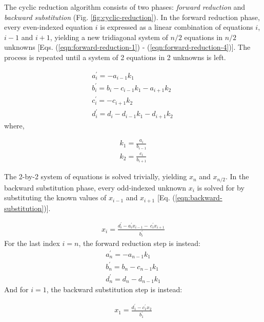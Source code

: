 The cyclic reduction algorithm consists of two phases:
\emph{forward reduction} and \emph{backward substitution}
(Fig. \ref{fig:cyclic-reduction}).
In the forward reduction phase,
every even-indexed equation $i$
is expressed as a
linear combination of equations $i$, $i-1$ and $i+1$,
yielding a new tridiagonal system of
$n/2$ equations in $n/2$ unknowns
[Eqs. (\ref{eqn:forward-reduction-1}) - (\ref{eqn:forward-reduction-4})].
The process is repeated until a system of
2 equations in 2 unknowns is left.

\begin{align} 
& a^{\prime}_i = -a_{i-1}k_1 \
    \label{eqn:forward-reduction-1}& \\
& b^{\prime}_i = b_i - c_{i-1}k_1 - a_{i+1}k_2 \
    \label{eqn:forward-reduction-2}& \\
& c^{\prime}_i = -c_{i+1}k_2 \
    \label{eqn:forward-reduction-3}& \\
& d^{\prime}_i = d_i - d_{i-1}k_1  - d_{i+1}k_2 \
    \label{eqn:forward-reduction-4}&
\end{align}
%
where,

\begin{align}
& k_1 = \frac{a_i}{b_{i-1}} \label{eqn:k1-update}& \\
& k_2 = \frac{c_i}{b_{i+1}} \label{eqn:k2-update}&
\end{align}

The 2-by-2 system of equations is solved trivially,
yielding $x_n$ and $x_{n/2}$.
In the backward substitution phase,
every odd-indexed unknown $x_i$ is solved for by
substituting the known values of $x_{i-1}$ and $x_{i+1}$
[Eq. (\ref{eqn:backward-substitution})].

\begin{align} \label{eqn:backward-substitution}
x_i = \frac{d^{\prime}_i - a^{\prime}_ix_{i-1} - \
    c^{\prime}_ix_{i+1}}{b^{\prime}_i}
\end{align}
%
For the last index $i=n$,
the forward reduction step is instead:
\begin{align} \label{eqn:forward-reduction-last}
    & a^{\prime}_n = -a_{n-1}k_1 & \\
    & b^{\prime}_n = b_n - c_{n-1}k_1 & \\
    & d^{\prime}_n = d_n - d_{n-1}k_1&
\end{align}
%
And for $i=1$, the backward substitution step is instead:

\begin{align} \label{eqn:backward-substitution-first}
x_1 = \frac{d^{\prime}_1 - c^{\prime}_1x_{2}}{b^{\prime}_1}
\end{align}

